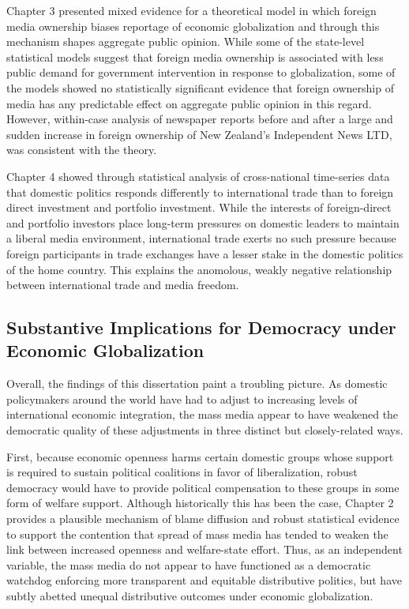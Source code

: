 \documentclass[12pt]{report}
\begin{document}
Chapter 3 presented mixed evidence for a theoretical model in which foreign media ownership biases reportage of economic globalization and through this mechanism shapes aggregate public opinion. While some of the state-level statistical models suggest that foreign media ownership is associated with less public demand for government intervention in response to globalization, some of the models showed no statistically significant evidence that foreign ownership of media has any predictable effect on aggregate public opinion in this regard. However, within-case analysis of newspaper reports before and after a large and sudden increase in foreign ownership of New Zealand's Independent News LTD, was consistent with the theory.

Chapter 4 showed through statistical analysis of cross-national time-series data that domestic politics responds differently to international trade than to foreign direct investment and portfolio investment. While the interests of foreign-direct and portfolio investors place long-term pressures on domestic leaders to maintain a liberal media environment, international trade exerts no such pressure because foreign participants in trade exchanges have a lesser stake in the domestic politics of the home country. This explains the anomolous, weakly negative relationship between international trade and media freedom.

\subsection{Substantive Implications for Democracy under Economic Globalization}

Overall, the findings of this dissertation paint a troubling picture. As domestic policymakers around the world have had to adjust to increasing levels of international economic integration, the mass media appear to have weakened the democratic quality of these adjustments in three distinct but closely-related ways.

First, because economic openness harms certain domestic groups whose support is required to sustain political coalitions in favor of liberalization, robust democracy would have to provide political compensation to these groups in some form of welfare support. Although historically this has been the case, Chapter 2 provides a plausible mechanism of blame diffusion and robust statistical evidence to support the contention that spread of mass media has tended to weaken the link between increased openness and welfare-state effort. Thus, as an independent variable, the mass media do not appear to have functioned as a democratic watchdog enforcing more transparent and equitable distributive politics, but have subtly abetted unequal distributive outcomes under economic globalization.
\end{document}
